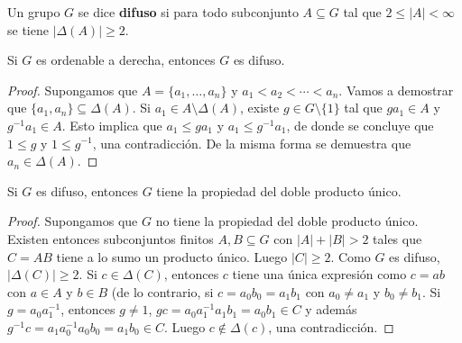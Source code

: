 \begin{definition}
	Un grupo $G$ se dice \textbf{difuso} si para todo subconjunto $A\subseteq
	G$ tal que $2\leq |A|<\infty$ se tiene $|\Delta(A)|\geq2$.
\end{definition}

\begin{lemma}
	Si $G$ es ordenable a derecha, entonces $G$ es difuso.	
\end{lemma}

\begin{proof}
	Supongamos que $A=\{a_1,\dots,a_n\}$ y $a_1<a_2<\cdots<a_n$. Vamos a
	demostrar que $\{a_1,a_n\}\subseteq\Delta(A)$. Si $a_1\in
	A\setminus\Delta(A)$, existe $g\in G\setminus\{1\}$ tal que $ga_1\in A$ y
	$g^{-1}a_1\in A$. Esto implica que $a_1\leq ga_1$ y $a_1\leq g^{-1}a_1$, de
	donde se concluye que $1\leq g$ y $1\leq g^{-1}$, una contradicción. De la
	misma forma se demuestra que $a_n\in \Delta(A)$.
\end{proof}

\begin{lemma}
	\label{lemma:difuso=>2up}
	Si $G$ es difuso, entonces $G$ tiene la propiedad del doble producto único.	
\end{lemma}

\begin{proof}
	Supongamos que $G$ no tiene la propiedad del doble producto único. Existen
	entonces subconjuntos finitos $A,B\subseteq G$ con $|A|+|B|>2$ tales que
	$C=AB$ tiene a lo sumo un producto único. Luego $|C|\geq2$. Como $G$ es
	difuso, $|\Delta(C)|\geq2$. Si $c\in\Delta(C)$, entonces $c$ tiene una
	única expresión como $c=ab$ con $a\in A$ y $b\in B$ (de lo contrario, si
	$c=a_0b_0=a_1b_1$ con $a_0\ne a_1$ y $b_0\ne b_1$. Si $g=a_0a_1^{-1}$,
	entonces $g\ne 1$, $gc=a_0a_1^{-1}a_1b_1=a_0b_1\in C$ y además
	$g^{-1}c=a_1a_0^{-1}a_0b_0=a_1b_0\in C$. Luego $c\not\in\Delta(c)$, una
	contradicción.
\end{proof}



